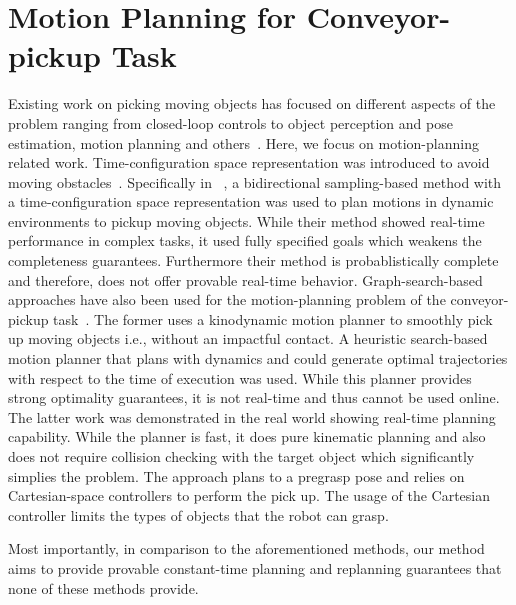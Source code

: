 \documentclass[a4paper]{report}
\begin{document}
\section{Motion Planning for Conveyor-pickup Task}
Existing work on picking moving objects has focused on different aspects of the problem ranging from closed-loop controls to object perception and pose estimation, motion planning and others~\cite{allen1993automated, han2019toward, stogl2017tracking, zhang2018gilbreth}. 
%
Here, we focus on motion-planning related work. Time-configuration space representation was introduced to avoid moving obstacles~\cite{fraichard1993dynamic,cefalo2013task,yang2018planning}. Specifically in ~\cite{yang2018planning}, a bidirectional sampling-based method with a time-configuration space representation was used to plan motions in dynamic environments to pickup moving objects. While their method showed real-time performance in complex tasks, it used fully specified goals which weakens the completeness guarantees. Furthermore their method is probablistically complete and therefore, does not offer provable real-time behavior. Graph-search-based approaches have also been used for the motion-planning problem of the conveyor-pickup task~\cite{cowley2013perception, menon2014motion}. The former uses a kinodynamic motion planner to smoothly pick up moving objects i.e., without an impactful contact. A heuristic search-based motion planner that plans with dynamics and could generate optimal trajectories with respect to the time of execution was used. While this planner provides strong optimality guarantees, it is not real-time and thus cannot be used online.
%
The latter work was demonstrated in the real world showing real-time planning capability. While the planner is fast, it does pure kinematic planning and also does not require collision checking with the target object which significantly simplies the problem. The approach plans to a pregrasp pose and relies on Cartesian-space controllers to perform the pick up. The usage of the Cartesian controller limits the types of objects that the robot can grasp.

Most importantly, in comparison to the aforementioned methods, our method aims to provide provable constant-time planning and replanning guarantees that none of these methods provide.
\end{document}
